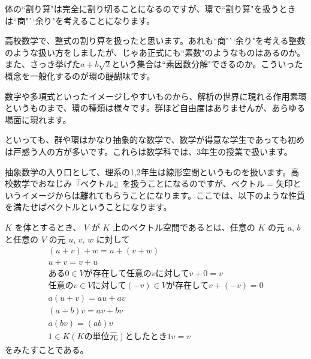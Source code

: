 体の``割り算"は完全に割り切ることになるのですが、環で``割り算"を扱うときは``商"``余り"を考えることになります。

高校数学で、整式の割り算を扱ったと思います。あれも``商"``余り"を考える整数のような扱い方をしましたが、じゃあ正式にも``素数"のようなものはあるのか。また、さっき挙げた$a + b\sqrt{2}$という集合は``素因数分解"できるのか。こういった概念を一般化するのが環の醍醐味です。

数字や多項式といったイメージしやすいものから、解析の世界に現れる作用素環というものまで、環の種類は様々です。群ほど自由度はありませんが、あらゆる場面に現れます。


といっても、群や環はかなり抽象的な数学で、数学が得意な学生であっても初めは戸惑う人の方が多いです。これらは数学科では、3年生の授業で扱います。

抽象数学の入り口として、理系の1,2年生は線形空間というものを扱います。高校数学でおなじみ『ベクトル』を扱うことになるのですが、$ベクトル = 矢印$というイメージからは離れてもらうことになります。ここでは、以下のような性質を満たせばベクトルということになります。

$K$ を体とするとき、 $V$ が $K$ 上のベクトル空間であるとは、任意の $K$ の元 $a$, $b$ と任意の $V$ の元 $u$, $v$, $w$ に対して
\begin{gather*}
(u + v) + w = u + (v + w) \\
u + v = v + u \\
ある0 \in V が存在して任意のvに対して v + 0 = v \\
任意のv \in V に対して (-v) \in Vが存在して v + (-v) = 0 \\
a(u + v) = au + av \\
(a + b)v = av + bv \\
a(bv) = (ab)v \\
1 \in K(Kの単位元)としたとき 1v = v
\end{gather*}
をみたすことである。



